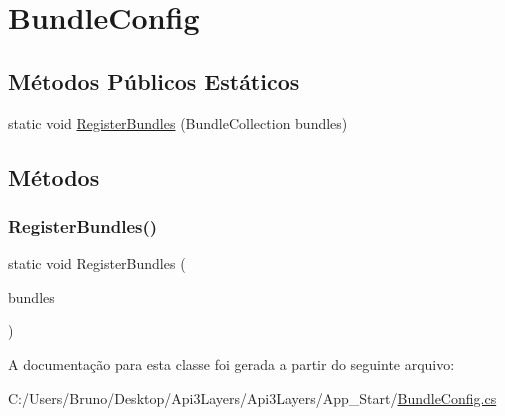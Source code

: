 \hypertarget{classApi3Layers_1_1BundleConfig}{}\section{Bundle\+Config}
\label{classApi3Layers_1_1BundleConfig}
\subsection*{Métodos Públicos Estáticos}
\begin{DoxyCompactItemize}
\item 
static void \hyperlink{classApi3Layers_1_1BundleConfig_afab9ce33b79d8441026ebdfebdf1e91b}{Register\+Bundles} (Bundle\+Collection bundles)
\end{DoxyCompactItemize}


\subsection{Métodos}
\mbox{\label{classApi3Layers_1_1BundleConfig_afab9ce33b79d8441026ebdfebdf1e91b}} 
\subsubsection{\texorpdfstring{Register\+Bundles()}{RegisterBundles()}}
{\footnotesize\ttfamily static void Register\+Bundles (\begin{DoxyParamCaption}\item[{Bundle\+Collection}]{bundles }\end{DoxyParamCaption})\hspace{0.3cm}{\ttfamily [static]}}



A documentação para esta classe foi gerada a partir do seguinte arquivo\+:\begin{DoxyCompactItemize}
\item 
C\+:/\+Users/\+Bruno/\+Desktop/\+Api3\+Layers/\+Api3\+Layers/\+App\+\_\+\+Start/\hyperlink{BundleConfig_8cs}{Bundle\+Config.\+cs}\end{DoxyCompactItemize}
